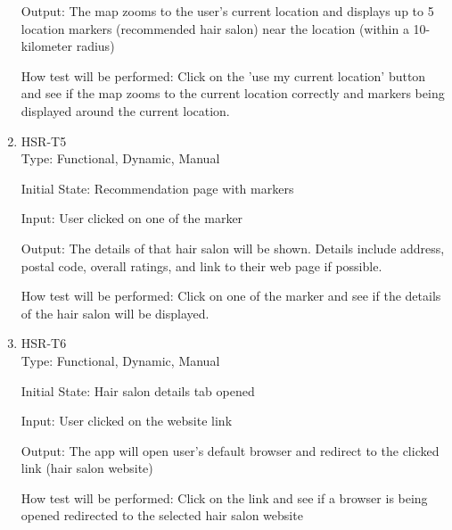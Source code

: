 \documentclass[12pt, titlepage]{article}
\begin{document}
\begin{enumerate}
Output: The map zooms to the user's current location and displays up to 5 location markers (recommended hair salon) near the location (within a 10-kilometer radius)
					
How test will be performed: Click on the 'use my current location' button and see if the map zooms to the current location correctly and markers being displayed around the current location.

\item{HSR-T5}\\
Type: Functional, Dynamic, Manual
					
Initial State: Recommendation page with markers
					
Input: User clicked on one of the marker
					
Output: The details of that hair salon will be shown. Details include address, postal code, overall ratings, and link to their web page if possible.
					
How test will be performed: Click on one of the marker and see if the details of the hair salon will be displayed.

\item{HSR-T6}\\
Type: Functional, Dynamic, Manual
					
Initial State: Hair salon details tab opened
					
Input: User clicked on the website link
					
Output: The app will open user's default browser and redirect to the clicked link (hair salon website)
					
How test will be performed: Click on the link and see if a browser is being opened redirected to the selected hair salon website
\end{enumerate}
\end{document}
